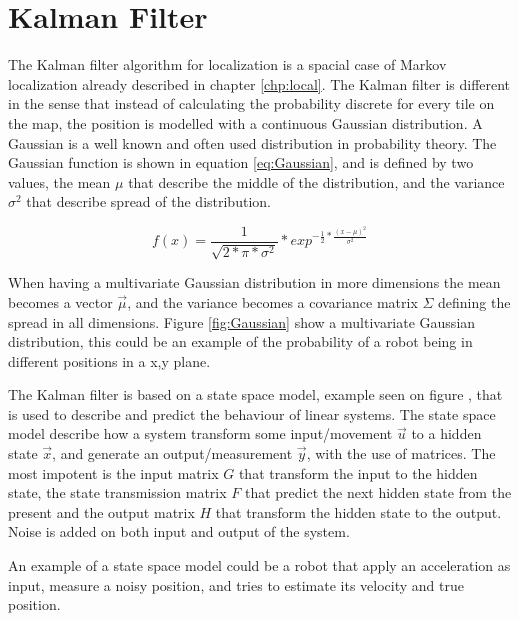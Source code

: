\chapter{Kalman Filter}
\label{chp:kalman}

The Kalman filter algorithm for localization is a spacial case of Markov localization already described in chapter \ref{chp:local}.
The Kalman filter is different in the sense that instead of calculating the probability discrete for every tile on the map, the position is modelled with a continuous Gaussian distribution.
A Gaussian is a well known and often used distribution in probability theory.
The Gaussian function is shown in equation \ref{eq:Gaussian}, and is defined by two values, the mean \emph{$\mu$} that describe the middle of the distribution, and the variance \emph{$\sigma^2$} that describe spread of the distribution.

\begin{equation}
\label{eq:Gaussian}
f(x) = \frac{1}{\sqrt{2*\pi*\sigma^2}} * exp^{-\frac{1}{2}*\frac{(x-\mu)^2}{\sigma^2}}
\end{equation}

When having a multivariate Gaussian distribution in more dimensions the mean becomes a vector \emph{$\vec{\mu}$}, and the variance becomes a covariance matrix \emph{$\Sigma$} defining the spread in all dimensions.
Figure \ref{fig:Gaussian} show a multivariate Gaussian distribution, this could be an example of the probability of a robot being in different positions in a x,y plane.


The Kalman filter is based on a state space model, example seen on figure , that is used to describe and predict the behaviour of linear systems.
The state space model describe how a system transform some input/movement \emph{$\vec{u}$} to a hidden state \emph{$\vec{x}$}, and generate an output/measurement \emph{$\vec{y}$}, with the use of matrices. The most impotent is the input matrix \emph{$G$} that transform the input to the hidden state, the state transmission matrix \emph{$F$} that predict the next hidden state from the present and the output matrix \emph{$H$} that transform the hidden state to the output. Noise is added on both input and output of the system.

An example of a state space model could be a robot that apply an acceleration as input, measure a noisy position, and tries to estimate its velocity and true position.

